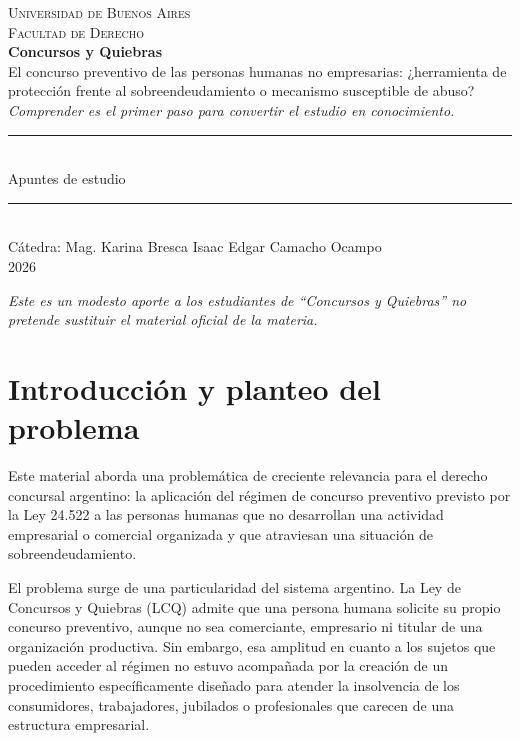 \documentclass[12pt,oneside]{book}
\newcommand{\universidad}{Universidad de Buenos Aires}
\newcommand{\facultad}{Facultad de Derecho}
\newcommand{\materia}{Concursos y Quiebras}
\newcommand{\titulo}{El concurso preventivo de las personas humanas no empresarias: ¿herramienta de protección frente al sobreendeudamiento o mecanismo susceptible de abuso?}
\newcommand{\autor}{Isaac Edgar Camacho Ocampo}
\newcommand{\anio}{2026}
\newcommand{\catedra}{Cátedra: Mag. Karina Bresca}
\begin{document}
\begin{titlepage}
\thispagestyle{empty}
\begin{center}
\vspace*{1cm}
{\large \textsc{\universidad}}\\[0.2cm]
{\large \textsc{\facultad}}\\[3cm]
{\Huge \textbf{\materia}}\\[1cm]
{\Large \titulo}\\[0.8cm]
\textit{Comprender es el primer paso para convertir el estudio en conocimiento.}\\[1.2cm]
\rule{0.70\textwidth}{0.5pt}\\[0.5cm]
{\large Apuntes de estudio}\\[0.5cm]
\rule{0.70\textwidth}{0.5pt}\\[0.8cm]
{\normalsize \catedra}
\vfill
{\large \autor}\\[0.3cm]
{\large \anio}
\end{center}
\vfill
\begin{flushleft}
\textit{Este es un modesto aporte a los estudiantes de ``Concursos y Quiebras'' no pretende sustituir el material oficial de la materia.}
\end{flushleft}
\end{titlepage}

\frontmatter
\tableofcontents
\mainmatter


\chapter[Introducción y planteo del problema]{Introducción y planteo del problema}

Este material aborda una problemática de creciente relevancia para el derecho concursal argentino: la aplicación del régimen de concurso preventivo previsto por la Ley 24.522 a las personas humanas que no desarrollan una actividad empresarial o comercial organizada y que atraviesan una situación de sobreendeudamiento.

El problema surge de una particularidad del sistema argentino. La Ley de Concursos y Quiebras (LCQ) admite que una persona humana solicite su propio concurso preventivo, aunque no sea comerciante, empresario ni titular de una organización productiva. Sin embargo, esa amplitud en cuanto a los sujetos que pueden acceder al régimen no estuvo acompañada por la creación de un procedimiento específicamente diseñado para atender la insolvencia de los consumidores, trabajadores, jubilados o profesionales que carecen de una estructura empresarial.
\end{document}
